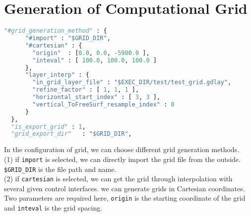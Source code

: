 \chapter{Generation of Computational Grid}\label{chapter-grid}

\begin{lstlisting}[language=python, title=run\_test.sh, frame=tb]
  "#grid_generation_method" : {
      "#import" : "$GRID_DIR",
      "#cartesian" : {
        "origin"  : [0.0, 0.0, -5900.0 ],
        "inteval" : [ 100.0, 100.0, 100.0 ]
      },
      "layer_interp" : {
        "in_grid_layer_file" : "$EXEC_DIR/test/test_grid.gdlay",  
        "refine_factor" : [ 1, 1, 1 ],
        "horizontal_start_index" : [ 3, 3 ],
        "vertical_ToFreeSurf_resample_index" : 0
      }
  },
  "is_export_grid" : 1,
  "grid_export_dir"   : "$GRID_DIR",               
\end{lstlisting}

In the configuration of grid, we can choose different grid generation methods. \\

(1) if \texttt{import} is selected, we can directly import the grid file from the outside. \texttt{\$GRID\_DIR}  is the file path and name. \\

(2) if \texttt{cartesian} is selected, we can get the grid through interpolation with several given control interfaces. we can generate grids in Cartesian coordinates. Two parameters are required here, \texttt{origin} is the starting coordinate of the grid and \texttt{inteval} is the grid spacing. \\


